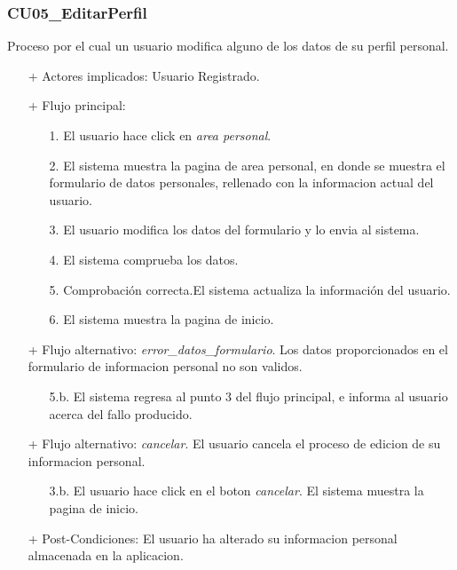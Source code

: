 \documentclass[a4paper]{report}
\begin{document}
            \subsubsection{CU05\_EditarPerfil}
                Proceso por el cual un usuario modifica alguno de los datos de su perfil personal.
                \begin{itemize}
                    \item[+] Actores implicados: Usuario Registrado.
                    \item[+] Flujo principal:
                    \begin{enumerate}
                        \item[1.] El usuario hace click en \emph{area personal}.
                        \item[2.] El sistema muestra la pagina de area personal, en donde se muestra el formulario de datos personales, rellenado con la informacion actual del usuario.
                        \item[3.] El usuario modifica los datos del formulario y lo envia al sistema.
                        \item[4.] El sistema comprueba los datos.
                        \item[5.] Comprobación correcta.El sistema actualiza la información del usuario.
                        \item[6.] El sistema muestra la pagina de inicio.
                    \end{enumerate}
                    \item[+] Flujo alternativo: \emph{error\_datos\_formulario}. Los datos proporcionados en el formulario de informacion personal no son validos.
                    \begin{itemize}
                        \item[5.b.] El sistema regresa al punto 3 del flujo principal, e informa al usuario acerca del fallo producido.
                    \end{itemize}
                    \item[+] Flujo alternativo: \emph{cancelar}. El usuario cancela el proceso de edicion de su informacion personal.
                    \begin{itemize}
                        \item[3.b.] El usuario hace click en el boton \emph{cancelar}. El sistema muestra la pagina de inicio.
                    \end{itemize}
                    \item[+] Post-Condiciones: El usuario ha alterado su informacion personal almacenada en la aplicacion.
                \end{itemize}
\end{document}
